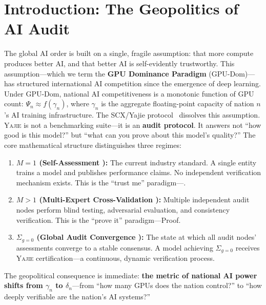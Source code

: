 \documentclass[11pt,a4paper]{article}
\theoremstyle{definition}
\theoremstyle{remark}
\newcommand{\Yajie}{\textsc{Yajie}}
\newcommand{\gpuDominance}{\textsf{GPU-Dom}}
\newcommand{\auditDepth}{\delta}
\newcommand{\gpuScale}{\gamma}
\newcommand{\sumGZero}{\Sigma_{g=0}}
\newcommand{\competitiveness}{\Psi}
\newcommand{\MAone}{M=1}
\newcommand{\MAmany}{M>1}
\begin{document}
\section{Introduction: The Geopolitics of AI Audit}
\label{sec:introduction}
The global AI order is built on a single, fragile assumption: that more compute produces better AI, and that better AI is self-evidently trustworthy. This assumption---which we term the \textbf{GPU Dominance Paradigm} (\gpuDominance)---has structured international AI competition since the emergence of deep learning. Under \gpuDominance, national AI competitiveness is a monotonic function of GPU count: $\competitiveness_n \approx f(\gpuScale_n)$, where $\gpuScale_n$ is the aggregate floating-point capacity of nation $n$'s AI training infrastructure.
The SCX/Yajie protocol~\cite{SCX2025,Yajie2026} dissolves this assumption. \Yajie{} is not a benchmarking suite---it is an \textbf{audit protocol}. It answers not ``how good is this model?'' but ``what can you prove about this model's quality?'' The core mathematical structure distinguishes three regimes:
\begin{enumerate}[label=(\roman*)]
    \item \textbf{$\MAone$ (Self-Assessment ):} The current industry standard. A single entity trains a model and publishes performance claims. No independent verification mechanism exists. This is the ``trust me'' paradigm---.
    \item \textbf{$\MAmany$ (Multi-Expert Cross-Validation ):} Multiple independent audit nodes perform blind testing, adversarial evaluation, and consistency verification. This is the ``prove it'' paradigm---Proof.
    \item \textbf{$\sumGZero$ (Global Audit Convergence ):} The state at which all audit nodes' assessments converge to a stable consensus. A model achieving $\sumGZero$ receives \Yajie{} certification---a continuous, dynamic verification process.
\end{enumerate}
The geopolitical consequence is immediate: \textbf{the metric of national AI power shifts from $\gpuScale_n$ to $\auditDepth_n$}---from ``how many GPUs does the nation control?'' to ``how deeply verifiable are the nation's AI systems?''
\end{document}
